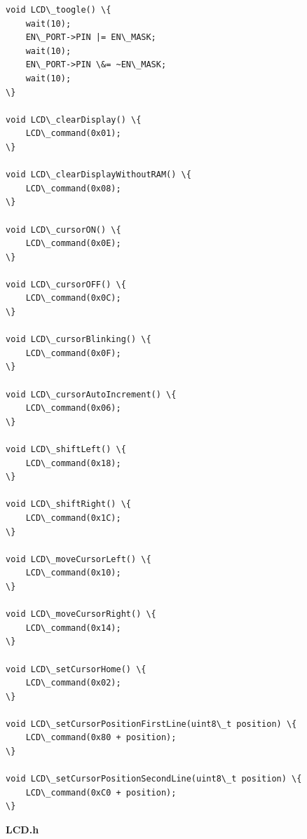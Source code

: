 \documentclass{article}
\begin{document}
\begin{lstlisting}
void LCD\_toogle() \{
	wait(10);
	EN\_PORT->PIN |= EN\_MASK;
	wait(10);
	EN\_PORT->PIN \&= ~EN\_MASK;
	wait(10);
\}

void LCD\_clearDisplay() \{
	LCD\_command(0x01);
\}

void LCD\_clearDisplayWithoutRAM() \{
	LCD\_command(0x08);
\}

void LCD\_cursorON() \{
	LCD\_command(0x0E);
\}

void LCD\_cursorOFF() \{
	LCD\_command(0x0C);
\}

void LCD\_cursorBlinking() \{
	LCD\_command(0x0F);
\}

void LCD\_cursorAutoIncrement() \{
	LCD\_command(0x06);
\}

void LCD\_shiftLeft() \{
	LCD\_command(0x18);
\}

void LCD\_shiftRight() \{
	LCD\_command(0x1C);
\}

void LCD\_moveCursorLeft() \{
	LCD\_command(0x10);
\}

void LCD\_moveCursorRight() \{
	LCD\_command(0x14);
\}

void LCD\_setCursorHome() \{
	LCD\_command(0x02);
\}

void LCD\_setCursorPositionFirstLine(uint8\_t position) \{
	LCD\_command(0x80 + position);
\}

void LCD\_setCursorPositionSecondLine(uint8\_t position) \{
	LCD\_command(0xC0 + position);
\}
\end{lstlisting}
\linebreak
\textbf{LCD.h}
\end{document}
